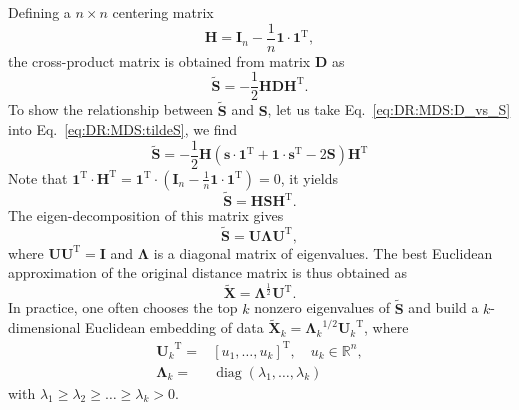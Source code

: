 Defining a $n\times n$ centering matrix
\begin{equation}
	\mathbf{H}=\mathbf{I}_n- \frac{1}{n}\mathbf{1}\cdot\mathbf{1}^{\operatorname{T}},
\end{equation}
the cross-product matrix is obtained from matrix $\mathbf{D}$ as
\begin{equation}
	\tilde{\mathbf{S}}=-\frac{1}{2}\mathbf{HD}\mathbf{H}^{\operatorname{T}}.
	\label{eq:DR:MDS:tildeS}
\end{equation}
To show the relationship between $\tilde{\mathbf{S}}$ and $\mathbf{S}$, let us take Eq.~\ref{eq:DR:MDS:D_vs_S} into Eq.~\ref{eq:DR:MDS:tildeS}, we find
\begin{equation}
	\tilde{\mathbf{S}}=-\frac{1}{2}\mathbf{H}\left(\mathbf{s}\cdot\mathbf{1}^{\operatorname{T}}+\mathbf{1}\cdot\mathbf{s}^{\operatorname{T}}-2\mathbf{S}\right)\mathbf{H}^{\operatorname{T}}
\end{equation}
Note that $\mathbf{1}^{\operatorname{T}}\cdot \mathbf{H}^{\operatorname{T}}=\mathbf{1}^{\operatorname{T}}\cdot\left(\mathbf{I}_n- \frac{1}{n}\mathbf{1}\cdot\mathbf{1}^{\operatorname{T}}\right)=0$, it yields
\begin{equation}
	\tilde{\mathbf{S}}=\mathbf{HS}\mathbf{H}^{\operatorname{T}}.
\end{equation}
The eigen-decomposition of this matrix gives
\begin{equation}
	\tilde{\mathbf{S}}=\mathbf{U\Lambda}\mathbf{U}^{\operatorname{T}},
\end{equation}
where $\mathbf{U}\mathbf{U}^{\operatorname{T}}=\mathbf{I}$ and $\mathbf{\Lambda}$ is a diagonal matrix of eigenvalues. The best Euclidean approximation of the original distance matrix is thus obtained as
\begin{equation}
	\tilde{\mathbf{X}}=\mathbf{\Lambda}^{\operatorname{\frac{1}{2}}}\mathbf{U}^{\operatorname{T}}.
\end{equation}
In practice, one often chooses the top $k$ nonzero eigenvalues of $\tilde{\mathbf{S}}$ and build a $k$-dimensional Euclidean embedding of data $\tilde{\mathbf{X}}_k={\mathbf{\Lambda}_k}^{1/2}{\mathbf{U}_k}^{\operatorname{T}}$, where
\begin{align*}
	{\mathbf{U}_k}^{\operatorname{T}}=&\left[u_1, \dots, u_k\right]^{\operatorname{T}},\quad u_k\in \mathbb{R}^n,\\
	\mathbf{\Lambda}_k=&\operatorname{diag}(\lambda_1,\dots,\lambda_k)
\end{align*}
with $\lambda_1\ge \lambda_2\ge \dots \ge \lambda_k>0$.